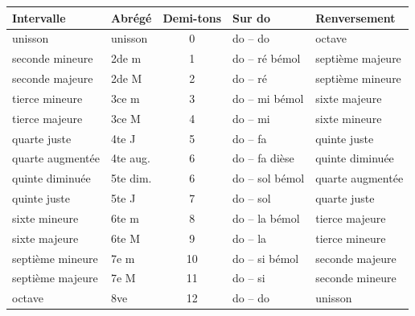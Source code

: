 
\begin{tabular}{@{}l l c l l@{}}
\toprule
\textbf{Intervalle} & \textbf{Abrégé} & \textbf{Demi-tons} & \textbf{Sur do} & \textbf{Renversement} \\
\midrule
unisson & unisson & 0 & do -- do & octave \\
seconde mineure & 2de m & 1 & do -- ré bémol & septième majeure \\
seconde majeure & 2de M & 2 & do -- ré & septième mineure \\
tierce mineure & 3ce m & 3 & do -- mi bémol & sixte majeure \\
tierce majeure & 3ce M & 4 & do -- mi & sixte mineure \\
quarte juste & 4te J & 5 & do -- fa & quinte juste \\
quarte augmentée & 4te aug. & 6 & do -- fa dièse & quinte diminuée \\
quinte diminuée & 5te dim. & 6 & do -- sol bémol & quarte augmentée \\
quinte juste & 5te J & 7 & do -- sol & quarte juste \\
sixte mineure & 6te m & 8 & do -- la bémol & tierce majeure \\
sixte majeure & 6te M & 9 & do -- la & tierce mineure \\
septième mineure & 7e m & 10 & do -- si bémol & seconde majeure \\
septième majeure & 7e M & 11 & do -- si & seconde mineure \\
octave & 8ve & 12 & do -- do & unisson \\
\bottomrule
\end{tabular}

